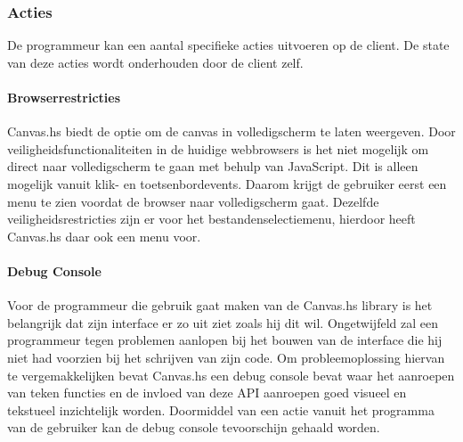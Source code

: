 \subsubsection{Acties}
De programmeur kan een aantal specifieke acties uitvoeren op de client. De state van deze acties wordt onderhouden door de client zelf.

\paragraph{Browserrestricties}
Canvas.hs biedt de optie om de canvas in volledigscherm te laten weergeven. Door veiligheidsfunctionaliteiten in de huidige webbrowsers is het niet mogelijk om direct naar volledigscherm te gaan met behulp van JavaScript. Dit is alleen mogelijk vanuit klik- en toetsenbordevents. Daarom krijgt de gebruiker eerst een menu te zien voordat de browser naar volledigscherm gaat. Dezelfde veiligheidsrestricties zijn er voor het bestandenselectiemenu, hierdoor heeft Canvas.hs daar ook een menu voor.


\paragraph{Debug Console}
Voor de programmeur die gebruik gaat maken van de Canvas.hs library is het belangrijk dat zijn interface er zo uit ziet zoals hij dit wil. Ongetwijfeld zal een programmeur tegen problemen aanlopen bij het bouwen van de interface die hij niet had voorzien bij het schrijven van zijn code. Om probleemoplossing hiervan te vergemakkelijken bevat Canvas.hs een debug console bevat waar het aanroepen van teken functies en de invloed van deze API aanroepen goed visueel en tekstueel inzichtelijk worden. Doormiddel van een actie vanuit het programma van de gebruiker kan de debug console tevoorschijn gehaald worden.